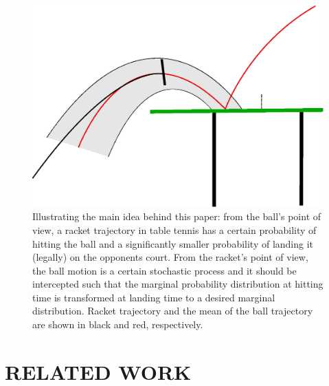 \documentclass[letterpaper, 10 pt, conference]{ieeeconf}
\begin{document}
\begin{figure}[t!]
\centering
\includegraphics[scale=0.4]{drawing.eps}			
\caption{Illustrating the main idea behind this paper: from the ball's point of view, a racket trajectory in table tennis has a certain probability of hitting the ball and a significantly smaller probability of landing it (legally) on the opponents court. From the racket's point of view, the ball motion is a certain stochastic process and it should be intercepted such that the marginal probability distribution at hitting time is transformed at landing time to a desired marginal distribution. Racket trajectory and the mean of the ball trajectory are shown in black and red, respectively. }
\label{mainIdea}
\end{figure}

\section{RELATED WORK}\label{relatedWork}

\end{document}
